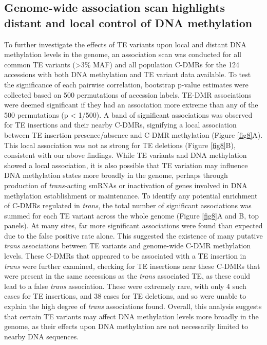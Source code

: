 \documentclass[12pt]{article}
\begin{document}
\subsection{Genome-wide association scan highlights
  distant and local control of DNA methylation}

To further investigate the effects of TE variants upon local and
distant DNA methylation levels in the genome, an association scan was
conducted for all common TE variants (\textgreater{}3\% MAF) and all
population C-DMRs for the 124 accessions with both DNA methylation and
TE variant data available. To test the significance of each pairwise
correlation, bootstrap p-value estimates were collected based on 500
permutations of accession labels. TE-DMR associations were deemed
significant if they had an association more extreme than any of the
500 permutations (p \textless{} 1/500). A band of significant
associations was observed for TE insertions and their nearby C-DMRs,
signifying a local association between TE insertion presence/absence
and C-DMR methylation (Figure \ref{fig8}A).  This local association was
not as strong for TE deletions (Figure \ref{fig8}B), consistent with our above
findings. While TE variants and DNA methylation showed a local
association, it is also possible that TE variation may influence DNA
methylation states more broadly in the genome, perhaps through
production of \emph{trans-}acting smRNAs or inactivation of genes
involved in DNA methylation establishment or maintenance. To identify
any potential enrichment of C-DMRs regulated in \emph{trans}, the
total number of significant associations was summed for each TE
variant across the whole genome (Figure \ref{fig8}A and B, top panels). At
many sites, far more significant associations were found than expected
due to the false positive rate alone. This suggested the existence of
many putative \emph{trans }associations between TE variants and
genome-wide C-DMR methylation levels. These C-DMRs that appeared to be
associated with a TE insertion in \emph{trans} were further
examined\emph{, }checking for TE insertions near these C-DMRs that
were present in the same accessions as the \emph{trans }associated TE,
as these could lead to a false \emph{trans }association. These were
extremely rare, with only 4 such cases for TE insertions, and 38 cases
for TE deletions, and so were unable to explain the high degree of
\emph{trans }associations found. Overall, this analysis suggests that
certain TE variants may affect DNA methylation levels more broadly in
the genome, as their effects upon DNA methylation are not necessarily
limited to nearby DNA sequences.
\end{document}
